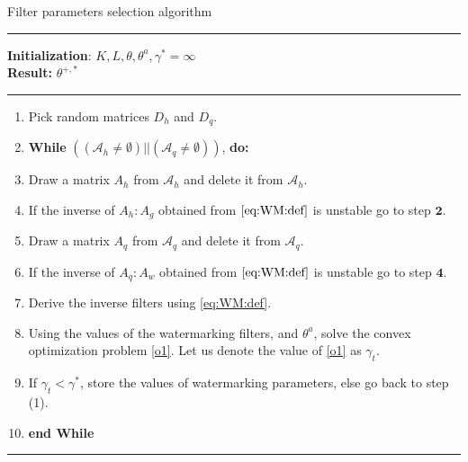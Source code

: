 \begin{algorithm}
\caption{Filter parameters selection algorithm}\vspace{-5pt}
\noindent\rule{8cm}{0.1pt}
\textbf{Initialization}: $K,L,\theta, \theta^a, \gamma^* = \infty$ \\
\textbf{Result:} $\theta^{+,*}$\vspace{-5pt}\\
\noindent\rule{8cm}{0.1pt}
\begin{enumerate}[label=\textbf{\arabic*:},leftmargin=*]
\item Pick random matrices $D_h$ and $D_q$.
\item[] \textbf{While} $((\mathcal{A}_h \neq \emptyset) || (\mathcal{A}_q \neq \emptyset))$, \textbf{do:}
    \item Draw a matrix $A_h$ from $\mathcal{A}_h$ and delete it from $\mathcal{A}_h$. 
    \item If the inverse of $A_h: A_g$ obtained from $\eqref{eq:WM:def}$ is unstable go to step $\textbf{2}$.
    \item Draw a matrix $A_q$ from $\mathcal{A}_q$ and delete it from $\mathcal{A}_q$. 
    \item If the inverse of $A_q: A_w$ obtained from $\eqref{eq:WM:def}$ is unstable go to step $\textbf{4}$.
    \item Derive the inverse filters using \eqref{eq:WM:def}.
    \item Using the values of the watermarking filters, and $\theta^a$, solve the convex optimization problem \eqref{o1}. Let us denote the value of \eqref{o1} as $\gamma_t$.
    \item If $\gamma_t < \gamma^*$, store the values of watermarking parameters, else go back to step (1).
    \item[] \textbf{end While}\vspace{-15pt}\\
\end{enumerate}
\noindent\rule{8cm}{0.1pt}
\label{algo2}
\end{algorithm}

